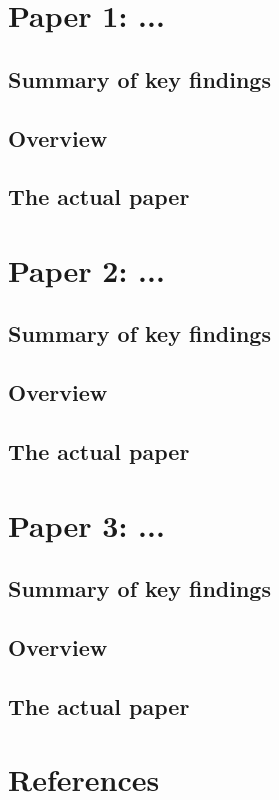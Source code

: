 \documentclass{report} %
\begin{document}
\begin{abstract}

\end{abstract}

\newpage %

\renewcommand{\abstractname}{Executive Summary} 
\begin{abstract}

\end{abstract}


\tableofcontents




\chapter{Paper 1: ...}
\section{Summary of key findings}
\section{Overview}
\section{The actual paper}

\chapter{Paper 2: ...}
\section{Summary of key findings}
\section{Overview}
\section{The actual paper}

\chapter{Paper 3: ...}
\section{Summary of key findings}
\section{Overview}
\section{The actual paper}

\chapter{References}
% 
% 
\end{document}

